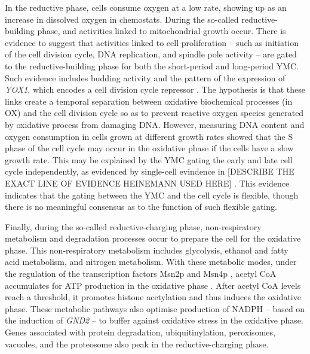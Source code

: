 In the reductive phase, cells consume oxygen at a low rate, showing up as an increase in dissolved oxygen in chemostats.
During the so-called reductive-building phase, and activities linked to mitochondrial growth occur.
There is evidence to suggest that activities linked to cell proliferation -- such as initiation of the cell division cycle, DNA replication, and spindle pole activity -- are gated to the reductive-building phase for both the short-period and long-period YMC.
Such evidence includes budding activity and the pattern of the expression of \emph{YOX1}, which encodes a cell division cycle repressor \citep{tuLogicYeastMetabolic2005}.
The hypothesis is that these links create a temporal separation between oxidative biochemical processes (in OX) and the cell division cycle so as to prevent reactive oxygen species generated by oxidative process from damaging DNA.
However, measuring DNA content and oxygen consumption in cells grown at different growth rates \citep{slavovCouplingGrowthRate2011} showed that the S phase of the cell cycle may occur in the oxidative phase if the cells have a slow growth rate.
This may be explained by the YMC gating the early and late cell cycle independently, as evidenced by single-cell evindence in [DESCRIBE THE EXACT LINE OF EVIDENCE HEINEMANN USED HERE] \parencite{papagiannakisAutonomousMetabolicOscillations2017}.
This evidence indicates that the gating between the YMC and the cell cycle is flexible,
though there is no meaningful consensus as to the function of such flexible gating.

Finally, during the so-called reductive-charging phase,
non-respiratory metabolism and degradation processes occur to prepare the cell for the oxidative phase.
This non-respiratory metabolism includes glycolysis, ethanol and fatty acid metabolism, and nitrogen metabolism.
With these metabolic modes, under the regulation of the transcription factors Msn2p and Msn4p \citep{kuangMsn2RegulateExpression2017}, acetyl CoA accumulates for ATP production in the oxidative phase \citep{tuLogicYeastMetabolic2005}.
After acetyl CoA levels reach a threshold, it promotes histone acetylation and thus induces the oxidative phase.
These metabolic pathways also optimise production of NADPH -- based on the induction of \emph{GND2} -- to buffer against oxidative stress in the oxidative phase.
Genes associated with protein degradation, ubiquitinylation, peroxisomes, vacuoles, and the proteosome also peak in the reductive-charging phase.

